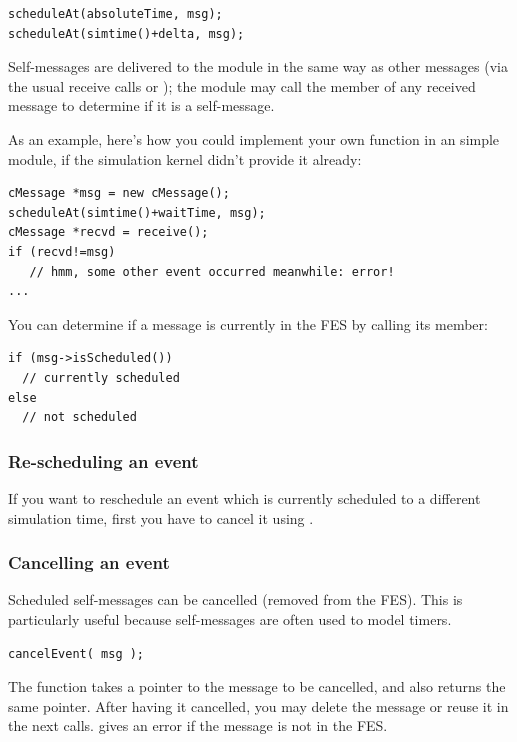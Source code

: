 \begin{verbatim}
scheduleAt(absoluteTime, msg);
scheduleAt(simtime()+delta, msg);
\end{verbatim}

Self-messages are delivered to the module in the same way as other
messages (via the usual receive calls or );
the module may call the  member of any received
message to determine if it is a self-message.

As an example, here's how you could implement your own 
function in an  simple module, if the simulation kernel
didn't provide it already:

\begin{verbatim}
cMessage *msg = new cMessage();
scheduleAt(simtime()+waitTime, msg);
cMessage *recvd = receive();
if (recvd!=msg)
   // hmm, some other event occurred meanwhile: error!
...
\end{verbatim}

You can determine if a message is currently in the FES
by calling its  member:

\begin{verbatim}
if (msg->isScheduled())
  // currently scheduled
else
  // not scheduled
\end{verbatim}


\subsubsection{Re-scheduling an event}

If you want to reschedule an event which is currently scheduled to a different
simulation time, first you have to cancel it using .


\subsubsection{Cancelling an event}

Scheduled self-messages can be cancelled
 (removed from the FES).
This is particularly useful because self-messages are often used
to model timers.

\begin{verbatim}
cancelEvent( msg );
\end{verbatim}

The  function takes a pointer to the message to
be cancelled, and also returns the same pointer. After having it
cancelled, you may delete the message or reuse it in the next
 calls.  gives an error if
the message is not in the FES.


